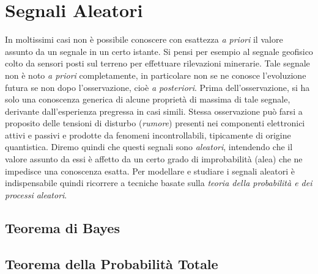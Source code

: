 \documentclass[12pt,oneside,openany]{memoir}
\numberwithin{equation}{subsection}
\begin{document}
\section{Segnali Aleatori}
In moltissimi casi non \`e possibile conoscere con esattezza \textit{a priori}
il valore assunto da un segnale in un certo istante. Si pensi per esempio al
segnale geofisico colto da sensori posti sul terreno per effettuare rilevazioni
minerarie. Tale segnale non \`e noto \textit{a priori} completamente, in
particolare non se ne conosce l'evoluzione futura se non dopo l'osservazione,
cio\`e \textit{a posteriori}. Prima dell'osservazione, si ha solo una conoscenza
generica di alcune propriet\`a di massima di tale segnale, derivante
dall'esperienza pregressa in casi simili. Stessa osservazione pu\`o farsi a
proposito delle tensioni di disturbo (\textit{rumore}) presenti nei componenti
elettronici attivi e passivi e prodotte da fenomeni incontrollabili, tipicamente
di origine quantistica. Diremo quindi che questi segnali sono \textit{aleatori},
intendendo che il valore assunto da essi \`e affetto da un certo grado di
improbabilit\`a (alea) che ne impedisce una conoscenza esatta. 
Per modellare e studiare i segnali aleatori \`e indispensabile quindi ricorrere
a tecniche basate sulla \textit{teoria della probabilit\`a e dei processi
aleatori}.


\newpage
\subsection{Teorema di Bayes}


\newpage
\subsection{Teorema della Probabilit\`a Totale}

\end{document}
